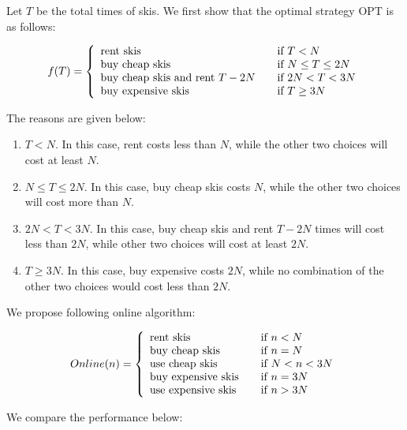 Let $T$ be the total times of skis. We first show that the optimal strategy OPT is as follows:

\[ f(T) = \left\{
  \begin{array}{l l}
    \text{rent skis} & \quad \text{if $T < N$}  \\
    \text{buy cheap skis} & \quad \text{if $N \leq T \leq 2N$} \\
    \text{buy cheap skis and rent $T - 2N$} & \quad \text{if $2N < T < 3N$} \\
    \text{buy expensive skis} & \quad \text{if $T \geq 3N$}\\
  \end{array} \right.
\]

\noindent
The reasons are given below:

\begin{enumerate}
\item \textbf{$T < N$}. In this case, rent costs less than $N$, while the other two choices will cost at least $N$.

\item \textbf{$N \leq T \leq 2N$}. In this case, buy cheap skis costs $N$, while the other two choices will cost more than $N$.

\item \textbf{$2N < T < 3N$}. In this case, buy cheap skis and rent $T-2N$ times will cost less than $2N$, while other two choices will cost at least $2N$.

\item \textbf{$T \geq 3N$}. In this case, buy expensive costs $2N$, while no combination of the other two choices would cost less than $2N$.
\end{enumerate}

\noindent
We propose following online algorithm:

\[Online(n) = \left\{
  \begin{array}{l l}
    \text{rent skis} & \quad \text{if $n < N$}  \\
    \text{buy cheap skis} & \quad \text{if $n = N$}  \\
    \text{use cheap skis} & \quad \text{if $N < n < 3N$} \\
    \text{buy expensive skis} & \quad \text{if $n = 3N$} \\
    \text{use expensive skis} & \quad \text{if $n > 3N$}\\
  \end{array} \right.
\]

\noindent
We compare the performance below:

